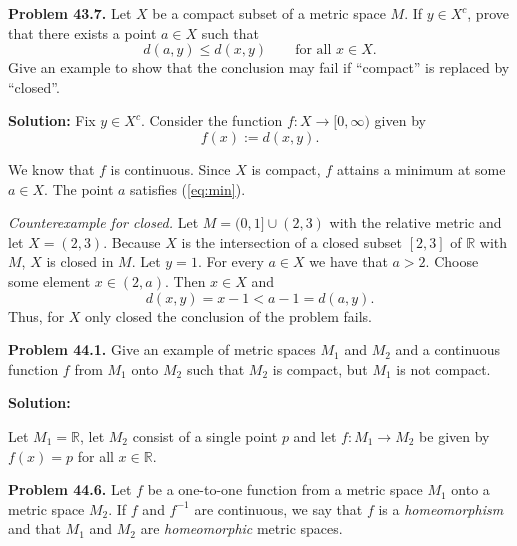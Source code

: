 \documentclass[12pt]{article}
\def\black{\color{black}}
\def\green{\color{rltgreen}}
\newcommand\beq{\begin{equation}}
\newcommand\eeq{\end{equation}}
\renewcommand\|{\ | \ }
\newcommand\ra{\rightarrow}
\newcommand\R{\mathbb{R}}
\def\pb#1{{\green \bf Problem #1.}\hskip 8pt \black}
\def\sol{\textbf{Solution:}}
\begin{document}

\pb{43.7}
Let $X$ be a compact subset of a metric space $M$. If $y \in X^c$, prove 
that there exists a point $a \in X$ such that 
\beq
\label{eq:min}
d(a, y) \leq d(x, y) \qquad \text{for all } x \in X.
\eeq
Give an example to show that the conclusion may fail if ``compact'' is
replaced by ``closed''.

\sol
Fix $y \in X^c$. Consider the function $f: X \ra [0, \infty)$ given by
\[
f(x) := d(x, y).
\]

We know that $f$ is continuous. Since $X$ is compact, $f$ attains a minimum
at some $a \in X$. The point $a$ satisfies (\ref{eq:min}).

\emph{Counterexample for closed.} Let $M = (0, 1] \cup (2, 3)$ with the 
relative metric and let $X = (2, 3)$. Because $X$ is the intersection of 
a closed subset $[2, 3]$ of $\R$ with $M$, $X$ is closed in $M$.
Let $y = 1$. For every $a \in X$ we have that $a > 2$. Choose some element
$x \in (2, a)$. Then $x \in X$ and 
\[
d(x, y) = x - 1 < a - 1 = d(a, y).
\]
Thus, for $X$ only closed the conclusion of the problem fails.


\pb{44.1}
Give an example of metric spaces $M_1$ and $M_2$ and a continuous function $f$
from $M_1$ onto $M_2$ such that $M_2$ is compact, but $M_1$ is not compact.

\sol

Let $M_1 = \R$, let $M_2$ consist of a single point $p$ and let 
$f: M_1 \ra M_2$ be given by $f(x) = p$ for all $x \in \R$. 


\pb{44.6}
Let $f$ be a one-to-one function from a metric space $M_1$ onto a metric
space $M_2$. If $f$ and $f^{-1}$ are continuous, we say that $f$ is a
\emph{homeomorphism} and that $M_1$ and $M_2$ are 
\emph{homeomorphic} metric spaces.
\end{document}
